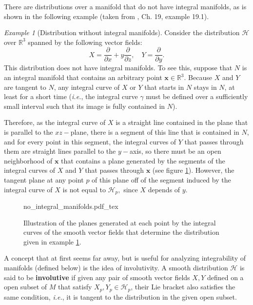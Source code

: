 \documentclass[12pt, letterpaper, reqno]{amsart}
\newcommand{\incfig}[2][1]{%
    \def\svgwidth{#1\columnwidth}
    {#2.pdf_tex}
}
\theoremstyle{definition}
\theoremstyle{plain}
\theoremstyle{remark}
\newtheorem{ex}{Example}
\begin{document}
There are distributions over a manifold that do not have integral manifolds, as is shown in the following example (taken from \cite{lee2003introduction}, Ch. 19, example 19.1).

\begin{ex}[Distribution without integral manifolds] \label{ex:no_integral_manifolds}
	Consider the distribution $ \mathcal{H} $ over $ \mathbb{R}^3 $ spanned by the following vector fields: 
	$$ X = \frac{\partial}{\partial x} + y \frac{\partial}{\partial z}, \quad Y = \frac{\partial}{\partial y}.  $$ 
	This distribution does not have integral manifolds. To see this, suppose that $ N $ is an integral manifold that contains an arbitrary point $ \textbf{x} \in \mathbb{R}^3.  $ Because $ X $ and $ Y $ are tangent to $ N $, any integral curve of $ X $ or $ Y $ that starts in $ N $ stays in $ N $, at least for a short time (\textit{i.e.}, the integral curve $ \gamma $ must be defined over a sufficiently small interval such that its image is fully contained in $ N $).   

	Therefore, as the integral curve of $ X $ is a straight line contained in the plane that is parallel to the $ xz- $plane, there is a segment of this line that is contained in $ N $, and for every point in this segment, the integral curves of $ Y $ that passes through them are straight lines parallel to the $ y- $axis, so there must be an open neighborhood of $ \textbf{x}  $ that contains a plane generated by the segments of the integral curves of $ X $ and $ Y $ that passes through $ \textbf{x}$ (see figure \ref{fig:no_integral_manifolds}). However, the tangent plane at any point $ p $  of this plane  off of the segment induced by the integral curve of $ X $ is not equal to $ \mathcal{H}_p, $ since $ X $ depends of $ y $.   
\end{ex}

\begin{figure}
    \centering
    \incfig{no_integral_manifolds}
    \caption{Illustration of the planes generated at each point by the integral curves of the smooth vector fields that determine the distribution given in example \ref{ex:no_integral_manifolds}.}
    \label{fig:no_integral_manifolds}
\end{figure}

A concept that at first seems far away, but is useful for analyzing integrability of manifolds (defined below) is the idea of involutivity. A smooth distribution $ \mathcal{H} $ is said to be \textbf{involutive} if given any pair of smooth vector fields $ X,Y $ defined on a open subset of $ M $  that satisfy $X_p,Y_p\in \mathcal{H}_p $, their Lie bracket also satisfies the same condition, \textit{i.e.}, it is tangent to the distribution in the given open subset. 
\end{document}
